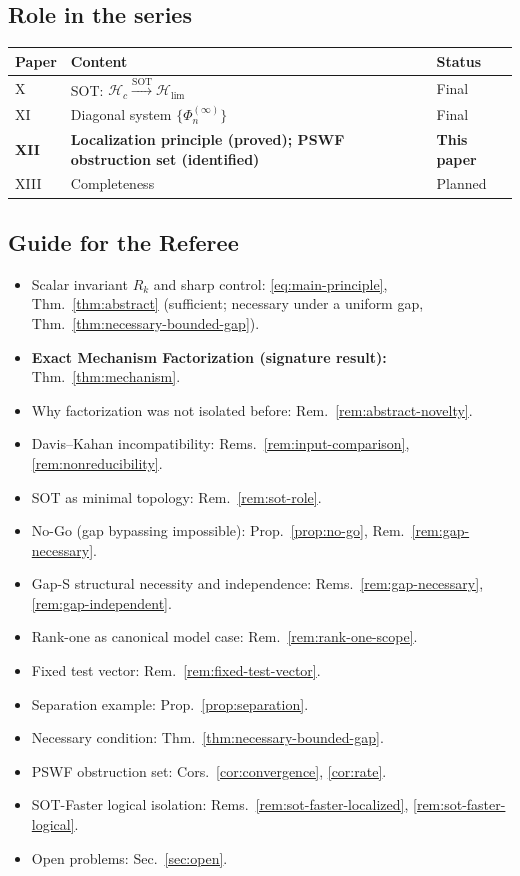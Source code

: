 \documentclass[12pt,a4paper]{amsart}
\theoremstyle{definition}
\theoremstyle{remark}
\newcommand{\Hlim}{\mathcal{H}_{\lim}}
\begin{document}
\subsection{Role in the series}
\begin{center}
\begin{tabular}{lll}
\toprule
Paper & Content & Status\\
\midrule
X & SOT: $\mathcal{H}_c
  \xrightarrow{\mathrm{SOT}}\Hlim$
  & Final\\
XI & Diagonal system
  $\{\Phi_n^{(\infty)}\}$
  & Final\\
\textbf{XII}
  & \textbf{Localization principle
  (proved); PSWF obstruction set
  (identified)}
  & \textbf{This paper}\\
XIII & Completeness
  & Planned\\
\bottomrule
\end{tabular}
\end{center}

\subsection*{Guide for the Referee}
\begin{itemize}
\item Scalar invariant $R_k$ and
  sharp control:
  \eqref{eq:main-principle},
  Thm.~\ref{thm:abstract}
  (sufficient; necessary under a
  uniform gap,
  Thm.~\ref{thm:necessary-bounded-gap}).
\item \textbf{Exact Mechanism
  Factorization (signature result):}
  Thm.~\ref{thm:mechanism}.
\item Why factorization was not
  isolated before:
  Rem.~\ref{rem:abstract-novelty}.
\item Davis--Kahan incompatibility:
  Rems.~\ref{rem:input-comparison},
  \ref{rem:nonreducibility}.
\item SOT as minimal topology:
  Rem.~\ref{rem:sot-role}.
\item No-Go (gap bypassing impossible):
  Prop.~\ref{prop:no-go},
  Rem.~\ref{rem:gap-necessary}.
\item Gap-S structural necessity
  and independence:
  Rems.~\ref{rem:gap-necessary},
  \ref{rem:gap-independent}.
\item Rank-one as canonical model case:
  Rem.~\ref{rem:rank-one-scope}.
\item Fixed test vector:
  Rem.~\ref{rem:fixed-test-vector}.
\item Separation example:
  Prop.~\ref{prop:separation}.
\item Necessary condition:
  Thm.~\ref{thm:necessary-bounded-gap}.
\item PSWF obstruction set:
  Cors.~\ref{cor:convergence},
  \ref{cor:rate}.
\item SOT-Faster logical isolation:
  Rems.~\ref{rem:sot-faster-localized},
  \ref{rem:sot-faster-logical}.
\item Open problems: Sec.~\ref{sec:open}.
\end{itemize}
\end{document}
